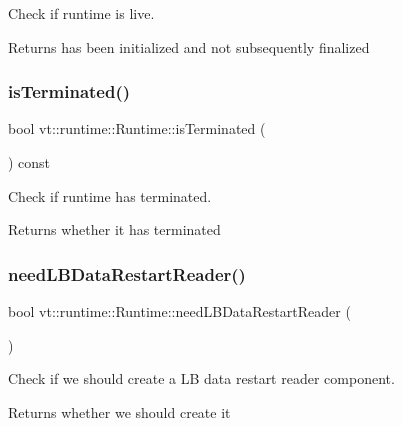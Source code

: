 Check if runtime is live. 

\begin{DoxyReturn}{Returns}
has been initialized and not subsequently finalized 
\end{DoxyReturn}
\mbox{\label{structvt_1_1runtime_1_1_runtime_a2c2561be8be311f01e11fc8e10725c77}} 
\subsubsection{\texorpdfstring{is\+Terminated()}{isTerminated()}}
{\footnotesize\ttfamily bool vt\+::runtime\+::\+Runtime\+::is\+Terminated (\begin{DoxyParamCaption}{ }\end{DoxyParamCaption}) const\hspace{0.3cm}{\ttfamily [inline]}}



Check if runtime has terminated. 

\begin{DoxyReturn}{Returns}
whether it has terminated 
\end{DoxyReturn}
\mbox{\label{structvt_1_1runtime_1_1_runtime_a494534b0e9e9fcbb10262442d7e427c9}} 
\subsubsection{\texorpdfstring{need\+L\+B\+Data\+Restart\+Reader()}{needLBDataRestartReader()}}
{\footnotesize\ttfamily bool vt\+::runtime\+::\+Runtime\+::need\+L\+B\+Data\+Restart\+Reader (\begin{DoxyParamCaption}{ }\end{DoxyParamCaption})\hspace{0.3cm}{\ttfamily [protected]}}



Check if we should create a LB data restart reader component. 

\begin{DoxyReturn}{Returns}
whether we should create it 
\end{DoxyReturn}
\mbox{\label{structvt_1_1runtime_1_1_runtime_aa9759e29e6159ac0d84c60dd609cbcad}} 
